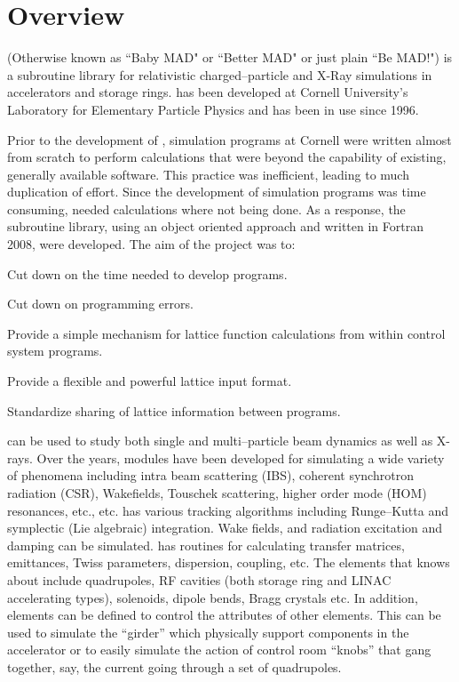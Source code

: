 \section*{Overview}

\bmad (Otherwise known as ``Baby MAD" or ``Better MAD" or just plain ``Be MAD!") is a subroutine
library for relativistic charged--particle and X-Ray simulations in accelerators and storage
rings. \bmad has been developed at Cornell University's Laboratory for Elementary Particle Physics
and has been in use since 1996.

Prior to the development of \bmad, simulation programs at Cornell were written almost from scratch
to perform calculations that were beyond the capability of existing, generally available
software. This practice was inefficient, leading to much duplication of effort.  Since the
development of simulation programs was time consuming, needed calculations where not being done.  As
a response, the \bmad subroutine library, using an object oriented approach and written in Fortran
2008, were developed.  The aim of the \bmad project was to:
\begin{Itemize}
\item Cut down on the time needed to develop programs.
\item Cut down on programming errors.
\item Provide a simple mechanism for lattice function calculations
from within control system programs.
\item Provide a flexible and powerful lattice input format.
\item Standardize sharing of lattice information between 
programs.
\end{Itemize}

\bmad can be used to study both single and multi--particle beam dynamics as well as X-rays.  Over
the years, \bmad modules have been developed for simulating a wide variety of phenomena including
intra beam scattering (IBS), coherent synchrotron radiation (CSR), Wakefields, Touschek scattering,
higher order mode (HOM) resonances, etc., etc.  \bmad has various tracking algorithms including
Runge--Kutta and symplectic (Lie algebraic) integration.  Wake fields, and radiation excitation and
damping can be simulated. \bmad has routines for calculating transfer matrices, emittances, Twiss
parameters, dispersion, coupling, etc. The elements that \bmad knows about include quadrupoles, RF
cavities (both storage ring and LINAC accelerating types), solenoids, dipole bends, Bragg crystals
etc.  In addition, elements can be defined to control the attributes of other elements. This can be
used to simulate the ``girder'' which physically support components in the accelerator or to easily
simulate the action of control room ``knobs'' that gang together, say, the current going through a
set of quadrupoles.


